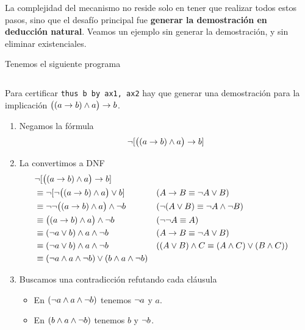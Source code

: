 La complejidad del mecanismo no reside solo en tener que realizar todos estos
pasos, sino que el desafío principal fue \textbf{generar la demostración en
deducción natural}. Veamos un ejemplo sin generar la demostración, y sin
eliminar existenciales.

\begin{ejemplo}
    Tenemos el siguiente programa

    \begin{figure}[H]
        \centering
        \begin{tabular}{c}
            
        \end{tabular}
    \end{figure}

    Para certificar \lstinline{thus b by ax1, ax2} hay que generar una
    demostración para la implicación $\big((a \to b) \wedge a \big)\to b$.

    \begin{enumerate}
        \item Negamos la fórmula 
        \[ \neg [ \big( (a \to b) \wedge a \big) \to b ] \]

        \item La convertimos a DNF
        \begin{align*}
            &\neg [ \big( (a \to b) \wedge a \big) \to b ] \\
            &\equiv \neg [ \neg \big( (a \to b) \wedge a \big) \vee b ]
                && (A \to B \equiv \neg A \vee B)\\
            &\equiv \neg \neg \big( (a \to b) \wedge a \big) \wedge \neg b
                && (\neg(A \vee B) \equiv \neg A \wedge \neg B)\\
            &\equiv \big( (a \to b) \wedge a \big) \wedge \neg b
                && (\neg\neg A \equiv A)\\
            &\equiv (\neg a \vee b) \wedge a \wedge \neg b
                 && (A \to B \equiv \neg A \vee B)\\
            &\equiv (\neg a \vee b) \wedge a \wedge \neg b
                && ((A \vee B) \wedge C \equiv (A \wedge C) \vee (B \wedge C))\\
            &\equiv
                (\neg a \wedge a \wedge \neg b)
                \vee
                (b \wedge a \wedge \neg b)
        \end{align*}

        \item Buscamos una contradicción refutando cada cláusula
        \begin{itemize}
            \item En $(\neg a \wedge a \wedge \neg b)$ tenemos $\neg a$ y $a$.
            \item En $(b \wedge a \wedge \neg b)$ tenemos $b$ y $\neg b$.
        \end{itemize}
    \end{enumerate}
\end{ejemplo}

